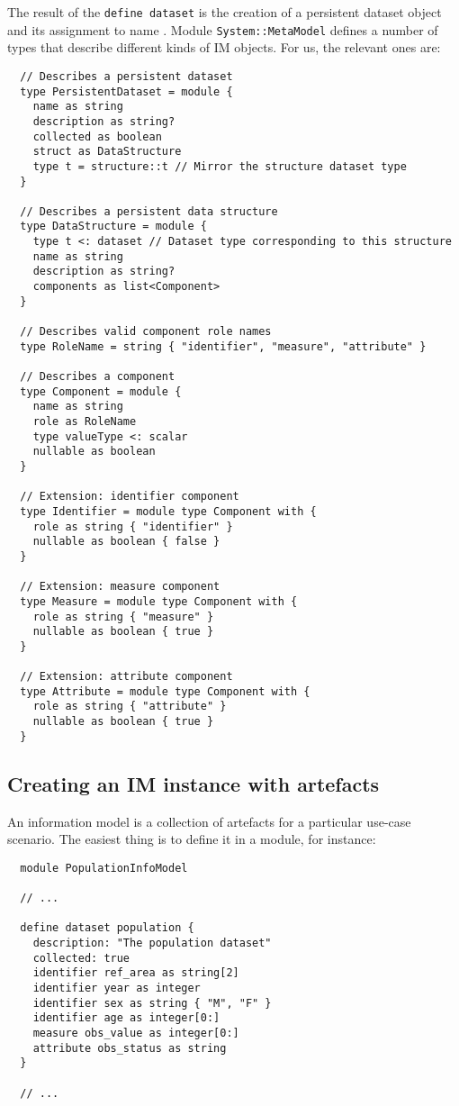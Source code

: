 \documentclass[droidmono,libertine,twoside,user,unofficial]{ecarticle}
\begin{document}
The result of the \texttt{define dataset} is the creation of a
persistent dataset object and its assignment to name .
Module \texttt{System::MetaModel} defines a number of types that
describe different kinds of IM objects.  For us, the relevant ones
are:
\begin{lstlisting}
  // Describes a persistent dataset
  type PersistentDataset = module {
    name as string
    description as string?
    collected as boolean
    struct as DataStructure
    type t = structure::t // Mirror the structure dataset type
  }

  // Describes a persistent data structure 
  type DataStructure = module {
    type t <: dataset // Dataset type corresponding to this structure
    name as string
    description as string?
    components as list<Component>
  }

  // Describes valid component role names
  type RoleName = string { "identifier", "measure", "attribute" }

  // Describes a component
  type Component = module {
    name as string
    role as RoleName
    type valueType <: scalar
    nullable as boolean
  }

  // Extension: identifier component
  type Identifier = module type Component with {
    role as string { "identifier" }
    nullable as boolean { false }
  }

  // Extension: measure component
  type Measure = module type Component with {
    role as string { "measure" }
    nullable as boolean { true }
  }

  // Extension: attribute component
  type Attribute = module type Component with {
    role as string { "attribute" }
    nullable as boolean { true }
  }
\end{lstlisting}

\subsection{Creating an IM instance with artefacts}

An information model is a collection of artefacts for a particular
use-case scenario.  The easiest thing is to define it in a module, for
instance:
\begin{lstlisting}
  module PopulationInfoModel

  // ...

  define dataset population {
    description: "The population dataset"
    collected: true
    identifier ref_area as string[2]
    identifier year as integer
    identifier sex as string { "M", "F" }
    identifier age as integer[0:]
    measure obs_value as integer[0:]
    attribute obs_status as string
  }

  // ...
 
\end{lstlisting}
\end{document}
